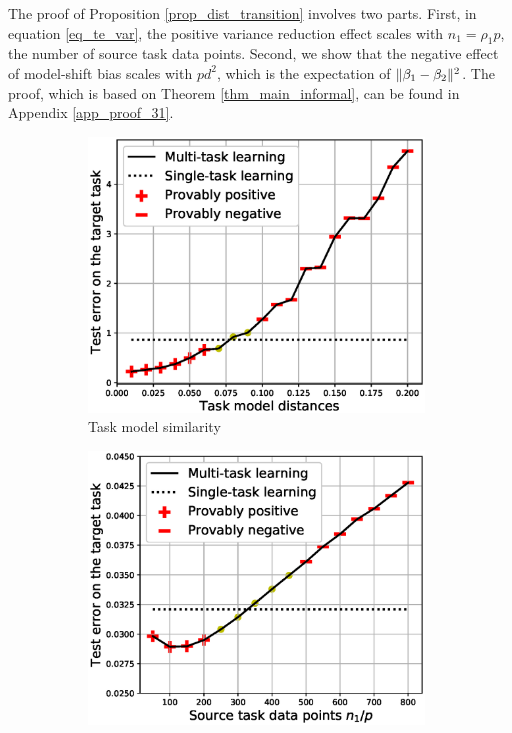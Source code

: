 The proof of Proposition \ref{prop_dist_transition} involves two parts.
First, in equation \eqref{eq_te_var}, the positive variance reduction effect scales with $n_1 = \rho_1 p$, the number of source task data points.
Second, we show that the negative effect of model-shift bias scales with $pd^2$, which is the expectation of $\|\beta_1 - \beta_2\|^2$.
The proof, which is based on Theorem \ref{thm_main_informal}, can be found in Appendix \ref{app_proof_31}. %

\begin{figure}
	\begin{subfigure}[b]{0.32\textwidth}
		\centering
		\includegraphics[width=0.98\textwidth]{figures/model_shift_phase_transition.eps}
		\caption{Task model similarity}
		\label{fig_model_shift}
	\end{subfigure}\hfill
	\begin{subfigure}[b]{0.32\textwidth}
		\centering
		\includegraphics[width=0.98\textwidth]{figures/datapoints_phase_transition.eps}

\end{subfigure}
\end{figure}
